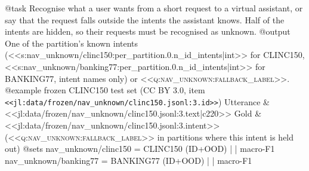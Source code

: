 @task
Recognise what a user wants from a short request to a virtual assistant, or say that the request falls outside the
intents the assistant knows. Half of the intents are hidden, so their requests must be recognised as unknown.
@output
One of the partition's known intents (<<s:nav_unknown/clinc150:per_partition.0.n_id_intents|int>> for CLINC150,
<<s:nav_unknown/banking77:per_partition.0.n_id_intents|int>> for BANKING77, intent names only) or
\textsc{<<q:nav_unknown:fallback_label>>}.
@example frozen CLINC150 test set (CC BY 3.0, item \texttt{<<jl:data/frozen/nav_unknown/clinc150.jsonl:3.id>>})
Utterance & <<jl:data/frozen/nav_unknown/clinc150.jsonl:3.text|c220>>
Gold & <<jl:data/frozen/nav_unknown/clinc150.jsonl:3.intent>> (\textsc{<<q:nav_unknown:fallback_label>>} in partitions where this intent is held out)
@sets
nav_unknown/clinc150 = CLINC150 (ID+OOD) | | macro-F1
nav_unknown/banking77 = BANKING77 (ID+OOD) | | macro-F1
